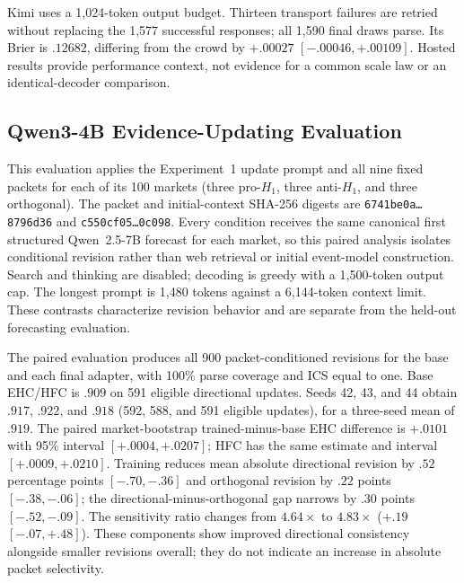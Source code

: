 Kimi uses a 1,024-token output budget. Thirteen transport failures are retried
without replacing the 1,577 successful responses; all 1,590 final draws parse.
Its Brier is $.12682$, differing from the crowd by $+.00027$
$[-.00046,+.00109]$. Hosted results provide performance context, not evidence
for a common scale law or an identical-decoder comparison.

\subsection{Qwen3-4B Evidence-Updating Evaluation}
\label{app:exp3b-update}
This evaluation applies the Experiment~1 update prompt and all nine fixed packets
for each of its 100 markets (three pro-$H_1$, three
anti-$H_1$, and three orthogonal). The packet and initial-context SHA-256 digests
are \texttt{6741be0a\ldots8796d36} and
\texttt{c550cf05\ldots0c098}. Every condition receives the same canonical first
structured Qwen~2.5-7B forecast for each market, so this paired analysis isolates
conditional revision rather than web retrieval or initial event-model
construction. Search and thinking are disabled; decoding is greedy with a
1,500-token output cap. The longest prompt is 1,480 tokens against a 6,144-token
context limit. These contrasts characterize revision behavior and are separate
from the held-out forecasting evaluation.

The paired evaluation produces all 900 packet-conditioned revisions for the base
and each final adapter, with 100\% parse coverage and ICS equal to one. Base
EHC/HFC is $.909$ on 591 eligible directional updates. Seeds 42, 43, and 44 obtain
$.917$, $.922$, and $.918$ (592, 588, and 591 eligible updates), for a
three-seed mean of $.919$. The paired market-bootstrap trained-minus-base EHC
difference is $+.0101$ with 95\% interval $[+.0004,+.0207]$; HFC has the same
estimate and interval $[+.0009,+.0210]$. Training reduces mean absolute
directional revision by $.52$ percentage points $[-.70,-.36]$ and orthogonal
revision by $.22$ points $[-.38,-.06]$; the directional-minus-orthogonal gap
narrows by $.30$ points $[-.52,-.09]$. The sensitivity ratio changes from
$4.64\times$ to $4.83\times$ ($+.19$ $[-.07,+.48]$). These components show
improved directional consistency alongside smaller revisions overall; they do
not indicate an increase in absolute packet selectivity.
\begin{center}
\begin{minipage}{.82\linewidth}
\centering
{}
\label{tab:exp3b-update-seed-results}
\scriptsize
\setlength{\tabcolsep}{4pt}
\resizebox{\linewidth}{!}{%

}
\end{minipage}
\end{center}

